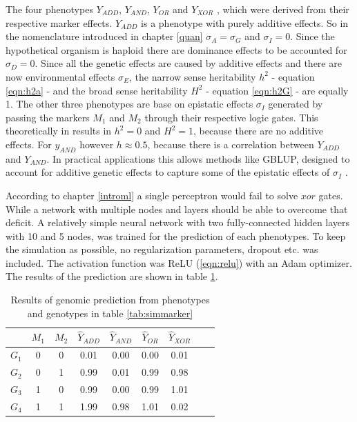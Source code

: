 The four phenotypes $Y_{ADD}$, $Y_{AND}$, $Y_{OR}$ and $Y_{XOR}$ , which were derived from their respective
marker effects. $Y_{ADD}$ is a phenotype with purely additive effects. So in the nomenclature introduced in
chapter \ref{quan} $\sigma_A = \sigma_G$ and $\sigma_{I} = 0$. Since the hypothetical organism is haploid
there are dominance effects to be accounted for $\sigma_D = 0$. Since all the genetic effects are caused by
additive effects and there are now environmental effects $\sigma_E$, the narrow sense heritability $h^2$ -
equation \ref{eqn:h2a} - and the broad sense heritability $H^2$ - equation \ref{eqn:h2G} - are equally 1. The
other three phenotypes are base on epistatic effects $\sigma_I$ generated by passing the markers $M_1$ and
$M_2$ through their respective logic gates. This theoretically in results in $h^2 = 0$ and $H^2 = 1$, because
there are no additive effects. For $y_{AND}$ however $h \approx 0.5$, because there is a correlation between
$Y_{ADD}$ and $Y_{AND}$. In practical applications this allows methods like GBLUP, designed to account for
additive genetic effects to capture some of the epistatic effects of $\sigma_I$ \cite{vieira2017assessing}.

According to chapter \ref{introml} a single perceptron would fail to solve $xor$ gates. While a network with
multiple nodes and layers should be able to overcome that deficit. A relatively simple neural network with two
fully-connected hidden layers with 10 and 5 nodes, was trained for the prediction of each phenotypes. To keep
the simulation as possible, no regularization parameters, dropout etc. was included. The activation function
was ReLU (\ref{eqn:relu}) with an Adam optimizer. The results of the prediction are shown in table
\ref{tab:simgpres}.

\begin{table}[H]
\caption{Results of genomic prediction from phenotypes and genotypes in table \ref{tab:simmarker}}
\label{tab:simgpres}
\centering
\begin{tabular}{ l c c | c c c c c c }
 \toprule
 & $M_1$ & $M_2$ & $\hat{Y}_{ADD}$ & $\hat{Y}_{AND}$ & $\hat{Y}_{OR}$ & $\hat{Y}_{XOR}$\\
 \midrule
 \hline 
 $G_1$ & 0 & 0 & 0.01 & 0.00 & 0.00 & 0.01 \\
 $G_2$ & 0 & 1 & 0.99 & 0.01 & 0.99 & 0.98 \\
 $G_3$ & 1 & 0 & 0.99 & 0.00 & 0.99 & 1.01 \\
 $G_4$ & 1 & 1 & 1.99 & 0.98 & 1.01 & 0.02 \\
 \bottomrule
\end{tabular}
\end{table}


